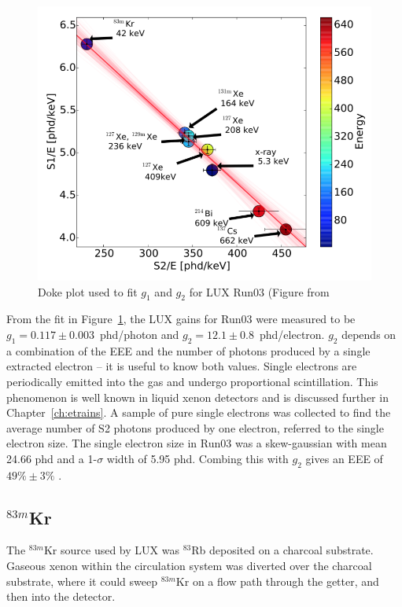 \begin{figure}[htbp]
\begin{center}
\includegraphics[width=\textwidth]{figures/lux/doke.png}
\caption{ Doke plot used to fit $g_{1}$ and $g_{2}$ for LUX Run03 (Figure from \cite{LUX:Run03Comprehensive}}
\label{fig:doke}
\end{center}
\end{figure}

From the fit in Figure~\ref{fig:doke}, the \ac{LUX} gains for Run03 were measured to be $g_{1} = 0.117 \pm 0.003$~phd/photon and $g_{2} = 12.1 \pm 0.8$~phd/electron. $g_{2}$ depends on a combination of the \ac{EEE} and the number of photons produced by a single extracted electron -- it is useful to know both values. Single electrons are periodically emitted into the gas and undergo proportional scintillation. This phenomenon is well known in liquid xenon detectors and is discussed further in Chapter~\ref{ch:etrains}. A sample of pure single electrons was collected to find the average number of S2 photons produced by one electron, referred to the single electron size. The single electron size in Run03 was a skew-gaussian with mean 24.66 phd and a 1-$\sigma$ width of 5.95 phd. Combing this with $g_{2}$ gives an \ac{EEE} of $49\% \pm 3\%$ \cite{LUX:Run03Comprehensive}.

\subsection{$^{83m}$Kr}
\label{sec:krypton}
The $^{83m}$Kr source used by \ac{LUX} was $^{83}$Rb deposited on a charcoal substrate. Gaseous xenon within the circulation system was diverted over the charcoal substrate, where it could sweep $^{83m}$Kr on a flow path through the getter, and then into the detector. 

